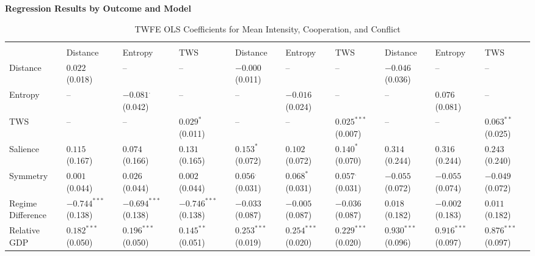 \documentclass[12pt]{article}
\begin{document}
\begin{center}
\Large\bfseries
Regression Results by Outcome and Model
\end{center}
\vspace{1em}


\begin{table}[htbp]\scriptsize
\centering
\caption{TWFE OLS Coefficients for Mean Intensity, Cooperation, and Conflict}
\renewcommand{\arraystretch}{1.2}
\begin{tabularx}{\textwidth}{
    l
    >{\centering\arraybackslash}X >{\centering\arraybackslash}X >{\centering\arraybackslash}X
    >{\centering\arraybackslash}X >{\centering\arraybackslash}X >{\centering\arraybackslash}X
    >{\centering\arraybackslash}X >{\centering\arraybackslash}X >{\centering\arraybackslash}X
}
\toprule
\rowcolor{gray!20}
 & \multicolumn{3}{c}{\textbf{Mean}} 
 & \multicolumn{3}{c}{\textbf{Cooperation}} 
 & \multicolumn{3}{c}{\textbf{Conflict}} \\
\cmidrule(lr){2-4} \cmidrule(lr){5-7} \cmidrule(lr){8-10}
 & Distance & Entropy & TWS & Distance & Entropy & TWS & Distance & Entropy & TWS \\
\midrule
Distance & $0.022^{}$ (0.018) & -- & -- & $-0.000^{}$ (0.011) & -- & -- & $-0.046^{}$ (0.036) & -- & -- \\
Entropy & -- & $-0.081^{.}$ (0.042) & -- & -- & $-0.016^{}$ (0.024) & -- & -- & $0.076^{}$ (0.081) & -- \\
TWS & -- & -- & $0.029^{*}$ (0.011) & -- & -- & $0.025^{***}$ (0.007) & -- & -- & $0.063^{**}$ (0.025) \\
Salience & $0.115^{}$ (0.167) & $0.074^{}$ (0.166) & $0.131^{}$ (0.165) & $0.153^{*}$ (0.072) & $0.102^{}$ (0.072) & $0.140^{*}$ (0.070) & $0.314^{}$ (0.244) & $0.316^{}$ (0.244) & $0.243^{}$ (0.240) \\
Symmetry & $0.001^{}$ (0.044) & $0.026^{}$ (0.044) & $0.002^{}$ (0.044) & $0.056^{.}$ (0.031) & $0.068^{*}$ (0.031) & $0.057^{.}$ (0.031) & $-0.055^{}$ (0.072) & $-0.055^{}$ (0.074) & $-0.049^{}$ (0.072) \\
Regime Difference & $-0.744^{***}$ (0.138) & $-0.694^{***}$ (0.138) & $-0.746^{***}$ (0.138) & $-0.033^{}$ (0.087) & $-0.005^{}$ (0.087) & $-0.036^{}$ (0.087) & $0.018^{}$ (0.182) & $-0.002^{}$ (0.183) & $0.011^{}$ (0.182) \\
Relative GDP & $0.182^{***}$ (0.050) & $0.196^{***}$ (0.050) & $0.145^{**}$ (0.051) & $0.253^{***}$ (0.019) & $0.254^{***}$ (0.020) & $0.229^{***}$ (0.020) & $0.930^{***}$ (0.096) & $0.916^{***}$ (0.097) & $0.876^{***}$ (0.097) \\

\end{tabularx}
\end{table}
\end{document}
